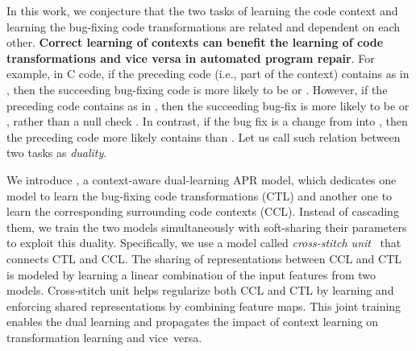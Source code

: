 
In this work, we conjecture that the two tasks of learning the code
context and learning the bug-fixing code transformations are related
and dependent on each other. {\bf Correct learning of contexts can
  benefit the learning of code transformations and vice versa in
  automated program repair}. For example, in C code, if the
preceding code (i.e., part of the context) contains  as in
, then the succeeding
bug-fixing code is more likely to be  or
. However, if the preceding code contains
 as in , then the
succeeding bug-fix is more likely to be  or
, rather than a null check . In contrast, if the bug fix is a
change from  into , then the
preceding code more likely contains  than .
Let us call such relation between two tasks as {\em duality}.

We introduce {\tool}, a context-aware dual-learning APR model, which
dedicates one model to learn the bug-fixing code transformations
(CTL) and another one to learn the corresponding surrounding code
contexts (CCL). Instead of cascading them, we train the two models
simultaneously with soft-sharing their parameters to exploit this
duality. Specifically, we use a model called {\em cross-stitch
unit}~\cite{misra2016cross} that connects CTL and CCL. The
sharing of representations between CCL and CTL is modeled by learning a linear combination of the input features from two models.
Cross-stitch unit helps regularize both CCL and CTL by learning and
enforcing shared representations by combining feature maps. This joint
training enables the dual learning and propagates the impact of 
context learning on transformation learning and vice~versa.

